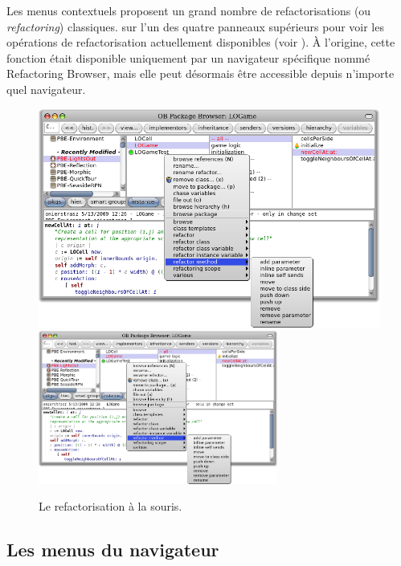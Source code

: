 \documentclass[a4paper,10pt,twoside]{book}
\begin{document}
Les menus contextuels proposent un grand nombre de refactorisations (ou
\emph{refactoring}) classiques. \Actclickz sur l'un des quatre panneaux
supérieurs pour voir les opérations de refactorisation actuellement
disponibles (voir ).
À l'origine, cette fonction était disponible uniquement
par un navigateur spécifique nommé Refactoring Browser, mais
elle peut désormais être accessible depuis n'importe quel
navigateur. %

\begin{figure}[btp]
	\begin{center}
	\ifluluelse
		{\includegraphics[width=\textwidth]{refactoring}}
		{\includegraphics[width=0.7\textwidth]{refactoring}}
	\end{center}
	\caption{Le refactorisation à la souris.}
\end{figure} %
\subsection{Les menus du navigateur}
\end{document}
